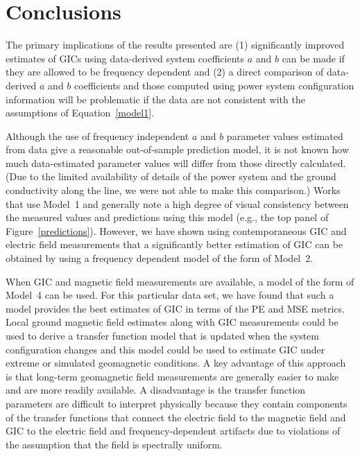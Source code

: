 \documentclass[draft,linenumbers]{agujournal2018}
\begin{document}
\section{Conclusions}

The primary implications of the results presented are (1) significantly improved estimates of GICs using data-derived system coefficients $a$ and $b$ can be made if they are allowed to be frequency dependent and (2) a direct comparison of data-derived $a$ and $b$ coefficients and those computed using power system configuration information will be problematic if the data are not consistent with the assumptions of Equation~\ref{model1}.

Although the use of frequency independent $a$ and $b$ parameter values estimated from data give a reasonable out-of-sample prediction model, it is not known how much data-estimated parameter values will differ from those directly calculated. (Due to the limited availability of details of the power system and the ground conductivity along the line, we were not able to make this comparison.) Works that use Model~1 and generally note a high degree of visual consistency between the measured values and predictions using this model (e.g., the top panel of Figure~\ref{predictions}). However, we have shown using contemporaneous GIC and electric field measurements that a significantly better estimation of GIC can be obtained by using a frequency dependent model of the form of Model~2.


When GIC and magnetic field measurements are available, a model of the form of Model~4 can be used. For this particular data set, we have found that such a model provides the best estimates of GIC in terms of the PE and MSE metrics. Local ground magnetic field estimates along with GIC measurements could be used to derive a transfer function model that is updated when the system configuration changes and this model could be used to estimate GIC under extreme or simulated geomagnetic conditions. A key advantage of this approach is that long-term geomagnetic field measurements are generally easier to make and are more readily available. A disadvantage is the transfer function parameters are difficult to interpret physically because they contain components of the transfer functions that connect the electric field to the magnetic field and GIC to the electric field and frequency-dependent artifacts due to violations of the assumption that the field is spectrally uniform.
\end{document}
